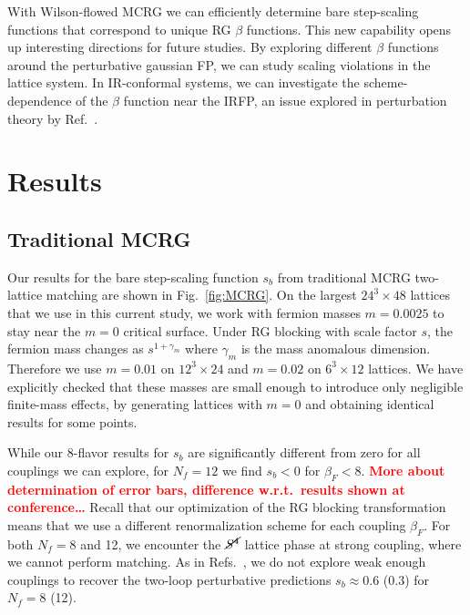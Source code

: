 \documentclass{PoS}
\newcommand{\be}{\ensuremath{\beta} }
\newcommand{\ga}{\ensuremath{\gamma} }
\newcommand{\X}{\ensuremath{\!\times\!} }
\newcommand{\Sb}{\ensuremath{\cancel{S^4}} }
\newcommand{\refcite}[1]{Ref.~\cite{#1}}
\newcommand{\fig}[1]{Fig.~\ref{#1}}
\newcommand{\TODO}[1]{\textcolor{red}{{\bf #1}}}
\begin{document}
With Wilson-flowed MCRG we can efficiently determine bare step-scaling functions that correspond to unique RG \be functions.
This new capability opens up interesting directions for future studies.
By exploring different \be functions around the perturbative gaussian FP, we can study scaling violations in the lattice system.
In IR-conformal systems, we can investigate the scheme-dependence of the \be function near the IRFP, an issue explored in perturbation theory by \refcite{Ryttov:2012nt}.



\section{Results} %
\subsection{\label{sec:MCRGresults}Traditional MCRG} %
Our results for the bare step-scaling function $s_b$ from traditional MCRG two-lattice matching are shown in \fig{fig:MCRG}.
On the largest $24^3\X48$ lattices that we use in this current study, we work with fermion masses $m = 0.0025$ to stay near the $m = 0$ critical surface.
Under RG blocking with scale factor $s$, the fermion mass changes as $s^{1 + \ga_m}$ where $\ga_m$ is the mass anomalous dimension.
Therefore we use $m = 0.01$ on $12^3\X24$ and $m = 0.02$ on $6^3\X12$ lattices.
We have explicitly checked that these masses are small enough to introduce only negligible finite-mass effects, by generating lattices with $m = 0$ and obtaining identical results for some points.

While our 8-flavor results for $s_b$ are significantly different from zero for all couplings we can explore, for $N_f = 12$ we find $s_b < 0$ for $\be_F < 8$. %
\TODO{More about determination of error bars, difference w.r.t.\ results shown at conference\dots}
Recall that our optimization of the RG blocking transformation means that we use a different renormalization scheme for each coupling $\be_F$.
For both $N_f = 8$ and 12, we encounter the \Sb lattice phase at strong coupling, where we cannot perform matching.
As in Refs.~\cite{Hasenfratz:2011xn, Hasenfratz:2011np}, we do not explore weak enough couplings to recover the two-loop perturbative predictions $s_b \approx 0.6$ (0.3) for $N_f = 8$ (12).
\end{document}
